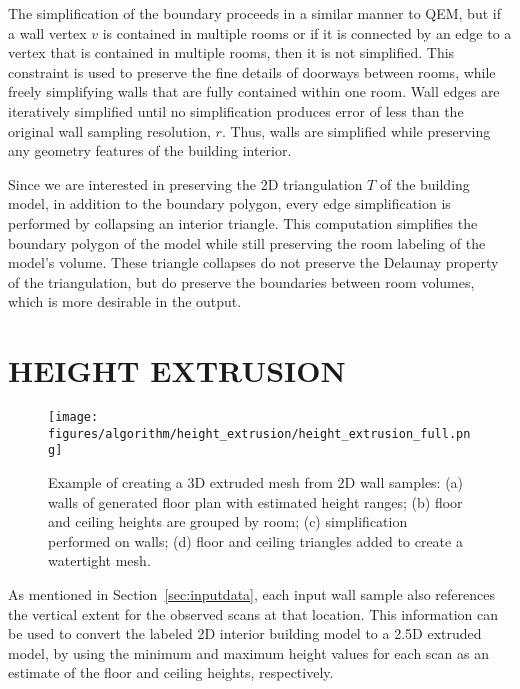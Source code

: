 \documentclass[a4paper,twoside]{article}
\begin{document}
The simplification of the boundary proceeds in a similar manner to QEM, but if a wall vertex $v$ is contained in multiple rooms or if it is connected by an edge to a vertex that is contained in multiple rooms, then it is not simplified.  This constraint is used to preserve the fine details of doorways between rooms, while freely simplifying walls that are fully contained within one room.  Wall edges are iteratively simplified until no simplification produces error of less than the original wall sampling resolution, $r$.  Thus, walls are simplified while preserving any geometry features of the building interior.

Since we are interested in preserving the 2D triangulation $T$ of the building model, in addition to the boundary polygon, every edge simplification is performed by collapsing an interior triangle.  This computation simplifies the boundary polygon of the model while still preserving the room labeling of the model's volume.  These triangle collapses do not preserve the Delaunay property of the triangulation, but do preserve the boundaries between room volumes, which is more desirable in the output.

\section{\uppercase{Height Extrusion}}
\label{sec:heightextrusion}

\begin{figure*}[t]
  \centering
  \texttt{[image: figures/algorithm/height\_extrusion/height\_extrusion\_full.png]}
  \caption{Example of creating a 3D extruded mesh from 2D wall samples:  (a) walls of generated floor plan with estimated height ranges; (b) floor and ceiling heights are grouped by room; (c) simplification performed on walls; (d) floor and ceiling triangles added to create a watertight mesh. }
  \label{fig:heightextrusion}
\end{figure*}

\noindent As mentioned in Section~\ref{sec:inputdata}, each input wall sample also references the vertical extent for the observed scans at that location.  This information can be used to convert the labeled 2D interior building model to a 2.5D extruded model, by using the minimum and maximum height values for each scan as an estimate of the floor and ceiling heights, respectively.
\end{document}
